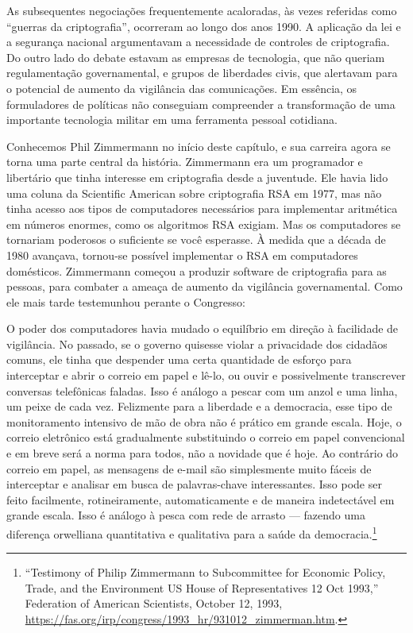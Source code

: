 \documentclass{book}
\begin{document}
As subsequentes negociações frequentemente acaloradas, às vezes referidas como ``guerras da criptografia'', ocorreram ao longo dos anos 1990. A aplicação da lei e a segurança nacional argumentavam a necessidade de controles de criptografia. Do outro lado do debate estavam as empresas de tecnologia, que não queriam regulamentação governamental, e grupos de liberdades civis, que alertavam para o potencial de aumento da vigilância das comunicações. Em essência, os formuladores de políticas não conseguiam compreender a transformação de uma importante tecnologia militar em uma ferramenta pessoal cotidiana.

Conhecemos Phil Zimmermann no início deste capítulo, e sua carreira agora se torna uma parte central da história. Zimmermann era um programador e libertário que tinha interesse em criptografia desde a juventude. Ele havia lido uma coluna da Scientific American sobre criptografia RSA em 1977, mas não tinha acesso aos tipos de computadores necessários para implementar aritmética em números enormes, como os algoritmos RSA exigiam. Mas os computadores se tornariam poderosos o suficiente se você esperasse. À medida que a década de 1980 avançava, tornou-se possível implementar o RSA em computadores domésticos. Zimmermann começou a produzir software de criptografia para as pessoas, para combater a ameaça de aumento da vigilância governamental. Como ele mais tarde testemunhou perante o Congresso:

O poder dos computadores havia mudado o equilíbrio em direção à facilidade de vigilância. No passado, se o governo quisesse violar a privacidade dos cidadãos comuns, ele tinha que despender uma certa quantidade de esforço para interceptar e abrir o correio em papel e lê-lo, ou ouvir e possivelmente transcrever conversas telefônicas faladas. Isso é análogo a pescar com um anzol e uma linha, um peixe de cada vez. Felizmente para a liberdade e a democracia, esse tipo de monitoramento intensivo de mão de obra não é prático em grande escala. Hoje, o correio eletrônico está gradualmente substituindo o correio em papel convencional e em breve será a norma para todos, não a novidade que é hoje. Ao contrário do correio em papel, as mensagens de e-mail são simplesmente muito fáceis de interceptar e analisar em busca de palavras-chave interessantes. Isso pode ser feito facilmente, rotineiramente, automaticamente e de maneira indetectável em grande escala. Isso é análogo à pesca com rede de arrasto --- fazendo uma diferença orwelliana quantitativa e qualitativa para a saúde da democracia.\footnote{“Testimony of Philip Zimmermann to Subcommittee for Economic Policy, Trade, and the Environment US House of Representatives 12 Oct 1993,” Federation of American Scientists, October 12, 1993, \url{https://fas.org/irp/congress/1993_hr/931012_zimmerman.htm}.}
\end{document}
